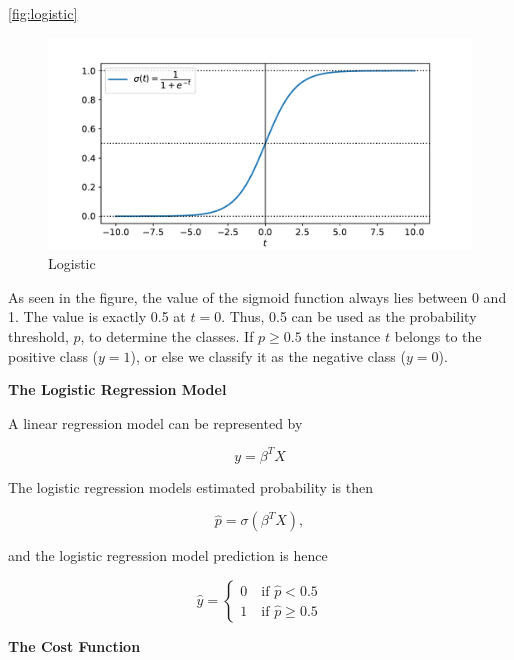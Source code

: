 \autoref{fig:logistic}

\begin{figure}[H]
\begin{center}\includegraphics[scale=0.6]{latex/figures/logistic_function.pdf}
\end{center}
\caption{Logistic}
\label{fig:logistic}
\end{figure}

As seen in the figure, the value of the sigmoid function always lies between 0 and 1. The value is exactly 0.5 at $t=0$. Thus, 0.5 can be used as the probability threshold, $p$, to determine the classes. If $p \geq 0.5$ the instance $t$ belongs to the positive class ($y = 1$), or else we classify it as the negative class ($y = 0$).

\textbf{The Logistic Regression Model}

A linear regression model can be represented by

\begin{equation}
    y = \beta^T X
\end{equation}

The logistic regression models estimated probability is then

\begin{equation}
    \hat{p} = \sigma (\beta^T X),
\end{equation}

and the logistic regression model prediction is hence

\begin{equation}
\hat{y} = \begin{cases} 0 \quad \text{if } \hat{p} < 0.5 \\ 1 \quad \text{if } \hat{p} \geq 0.5 \end{cases} 
\end{equation}

\textbf{The Cost Function}

